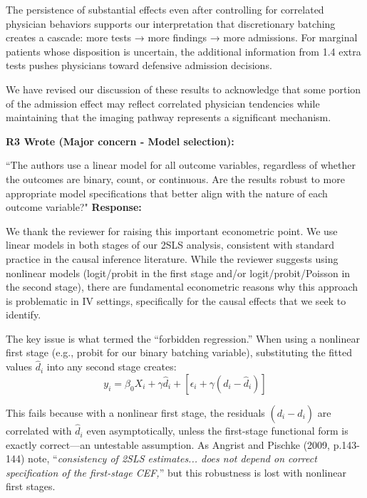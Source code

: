 \documentclass[11pt]{article}
\newenvironment{quote2}
{ \bigskip
\noindent
         \small\em
         \baselineskip=14pt
}
\newcommand{\1}{\hbox{\rm 1\kern-.35em 1}}
\begin{document}
{The persistence of substantial effects even after controlling for correlated physician behaviors supports our interpretation that discretionary batching creates a cascade: more tests → more findings → more admissions. For marginal patients whose disposition is uncertain, the additional information from 1.4 extra tests pushes physicians toward defensive admission decisions.

We have revised our discussion of these results to acknowledge that some portion of the admission effect may reflect correlated physician tendencies while maintaining that the imaging pathway represents a significant mechanism.
\color{black}


\begin{quote2}
\textbf{R3 Wrote (Major concern -  Model selection):}  

\noindent``The authors use a linear model for all outcome variables, regardless of whether the outcomes are binary, count, or continuous. Are the results robust to more appropriate model specifications that better align with the nature of each outcome variable?"
\end{quote2}


\noindent\textbf{Response:} \color{blue} {We thank the reviewer for raising this important econometric point. We use linear models in both stages of our 2SLS analysis, consistent with standard practice in the causal inference literature. While the reviewer suggests using nonlinear models (logit/probit in the first stage and/or logit/probit/Poisson in the second stage), there are fundamental econometric reasons why this approach is problematic in IV settings, specifically for the causal effects that we seek to identify.

The key issue is what \cite{Hausman1975, Hausman1978} termed the ``forbidden regression.'' When using a nonlinear first stage (e.g., probit for our binary batching variable), substituting the fitted values $\hat{d}_i$ into any second stage creates:
$$y_i = \beta_0 X_i + \gamma \hat{d}_i + [\epsilon_i + \gamma(d_i - \hat{d}_i)]$$

This fails because with a nonlinear first stage, the residuals $(d_i - \hat{d}_i)$ are correlated with $\hat{d}_i$ even asymptotically, unless the first-stage functional form is exactly correct—an untestable assumption. As Angrist and Pischke (2009, p.143-144) note, ``\textit{consistency of 2SLS estimates... does not depend on correct specification of the first-stage CEF,}'' but this robustness is lost with nonlinear first stages.

}}
\end{document}
